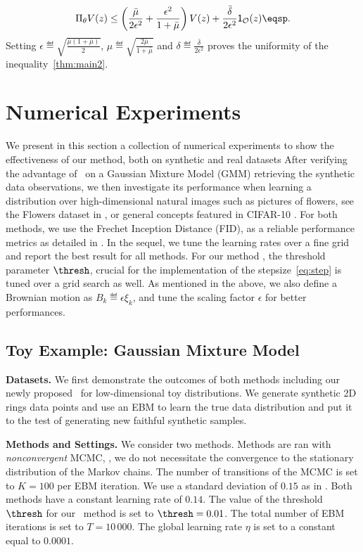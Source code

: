 \documentclass[letterpaper]{article} %
\begin{document}
\begin{align}\notag
\Pi_\theta V(z) \leq \left(\frac{\bar{\mu}}{2 \epsilon^2} + \frac{\epsilon^2}{1 + \bar{\mu}} \right) V(z) +\frac{\bar{\delta}}{2 \epsilon^2} \mathsf{1}_{\mathcal{O}}(z) \eqsp.
\end{align}
Setting $\epsilon \eqdef \sqrt{\frac{\bar{\mu}(1+\bar{\mu})}{2}}$, $ \mu  \eqdef  \sqrt{\frac{2\bar{\mu}}{1+\bar{\mu}}}$ and $\delta \eqdef \frac{\bar{\delta}}{2 \epsilon^2}$ proves the uniformity of the inequality~\eqref{thm:main2}.

\section{Numerical Experiments}\label{sec:numericals}


We present in this section a collection of numerical experiments to show the effectiveness of our method, both on synthetic and real datasets
After verifying the advantage of \algo\ on a Gaussian Mixture Model (GMM) retrieving the synthetic data observations, we then investigate its performance when learning a distribution over high-dimensional natural images such as pictures of flowers, see the Flowers dataset in \cite{nilsback2008automated}, or general concepts featured in CIFAR-10 \cite{krizhevsky2009learning}.
For both methods, we use the Frechet Inception Distance (FID), as a reliable performance metrics as detailed in \cite{heusel2017gans}.
In the sequel, we tune the learning rates over a fine grid and report the best result for all methods.
For our method \algo, the threshold parameter $\thresh$, crucial for the implementation of the stepsize~\eqref{eq:step} is tuned over a grid search as well.
As mentioned in the above, we also define a Brownian motion as $B_k \eqdef \epsilon \xi_k$, and tune the scaling factor $\epsilon$ for better performances.

\subsection{Toy Example: Gaussian Mixture Model}

\textbf{Datasets.}
We first demonstrate the outcomes of both methods including our newly proposed \algo\ for low-dimensional toy distributions.
We generate synthetic 2D rings data points and use an EBM to learn the true data distribution and put it to the test of generating new faithful synthetic samples.

\medskip
\textbf{Methods and Settings.}
We consider two methods. 
Methods are ran with \emph{nonconvergent} MCMC, \ie, we do not necessitate the convergence to the stationary distribution of the Markov chains.
The number of transitions of the MCMC is set to $K= 100$ per EBM iteration. 
We use a standard deviation of $0.15$ as in \cite{nijkamp2020anatomy}.
Both methods have a constant learning rate of $0.14$.
The value of the threshold $\thresh$ for our \algo\ method is set to $\thresh = 0.01$.
The total number of EBM iterations is set to $T = 10\,000$.
The global learning rate $\eta$ is set to a constant equal to $0.0001$.
\end{document}
